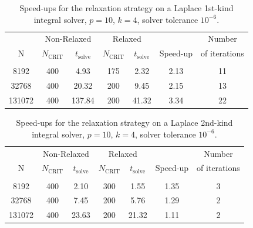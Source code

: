 \documentclass[final,3p,times]{elsarticle}
\newcommand{\ncrit}{N_{\text{CRIT}}}
\newcommand{\tsolve}{t_{\text{solve}}}
\begin{document}
\begin{table}[h]
\footnotesize
\begin{center}
\begin{tabular}{c|cc|cc|cc}
  & \multicolumn{2}{c|}{Non-Relaxed} & \multicolumn{2}{c|}{Relaxed} &  & Number\\
  N & $\ncrit$ & $\tsolve$ & $\ncrit$ & $\tsolve$ & Speed-up & of iterations\\
 \hline
   & & & & & &\\
  8192 & 400 & 4.93 & 175 & 2.32 & 2.13 & 11\\
  32768  & 400 & 20.32 & 200 & 9.45 & 2.15 & 13\\
  131072  & 400 & 137.84 & 200 & 41.32 & 3.34 & 22\\
 
\end{tabular}
\end{center}
\caption{Speed-ups for the relaxation strategy on a Laplace 1st-kind integral solver, $p=10$, $k=4$, solver tolerance $10^{-6}$.}
\label{tab:laplace_1st_relaxation}
\end{table}%

\begin{table}[h]
\footnotesize
\begin{center}
\begin{tabular}{c|cc|cc|cc}
  & \multicolumn{2}{c|}{Non-Relaxed} & \multicolumn{2}{c|}{Relaxed} &  & Number \\
  N & $\ncrit$ & $\tsolve$ & $\ncrit$ & $\tsolve$ & Speed-up & of iterations \\
 \hline
   & & & & & & \\
  8192 & 400 & 2.10 & 300 & 1.55 & 1.35 & 3 \\
  32768 & 400 & 7.45 & 200 & 5.76 & 1.29 & 2 \\
  131072 & 400 & 23.63 & 200 & 21.32 & 1.11 & 2\\
 
\end{tabular}
\end{center}
\caption{Speed-ups for the relaxation strategy on a Laplace 2nd-kind integral solver, $p=10$, $k=4$, solver tolerance  $10^{-6}$.}
\label{tab:laplace_2nd_relaxation}
\end{table}%
\end{document}
